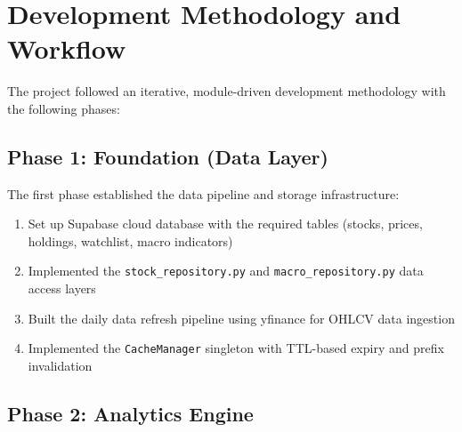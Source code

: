 \documentclass[12pt, a4paper, oneside]{report}
\begin{document}
\section{Development Methodology and Workflow}
\label{sec:dev_methodology}

The project followed an iterative, module-driven development methodology with the following phases:

\subsection{Phase 1: Foundation (Data Layer)}

The first phase established the data pipeline and storage infrastructure:
\begin{enumerate}[nosep]
    \item Set up Supabase cloud database with the required tables (stocks, prices, holdings, watchlist, macro indicators)
    \item Implemented the \texttt{stock\_repository.py} and \texttt{macro\_repository.py} data access layers
    \item Built the daily data refresh pipeline using yfinance for OHLCV data ingestion
    \item Implemented the \texttt{CacheManager} singleton with TTL-based expiry and prefix invalidation
\end{enumerate}

\subsection{Phase 2: Analytics Engine}
\end{document}
